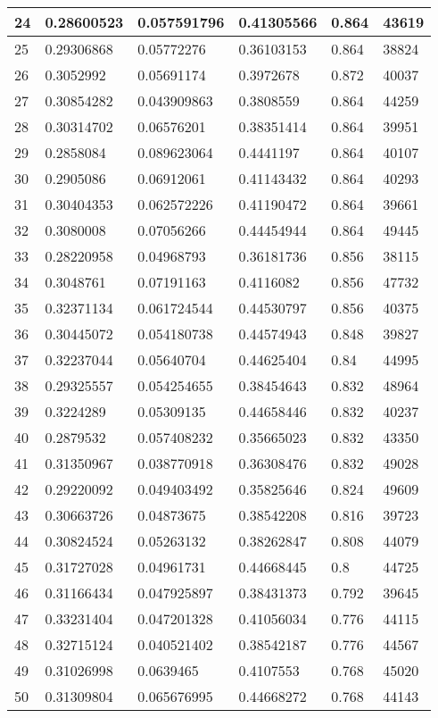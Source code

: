 \begin{longtable}{|l|l|l|l|l|l|}
24 & 0.28600523 & 0.057591796 & 0.41305566 & 0.864 & 43619 \\ \hline 
25 & 0.29306868 & 0.05772276 & 0.36103153 & 0.864 & 38824 \\ \hline 
26 & 0.3052992 & 0.05691174 & 0.3972678 & 0.872 & 40037 \\ \hline 
27 & 0.30854282 & 0.043909863 & 0.3808559 & 0.864 & 44259 \\ \hline 
28 & 0.30314702 & 0.06576201 & 0.38351414 & 0.864 & 39951 \\ \hline 
29 & 0.2858084 & 0.089623064 & 0.4441197 & 0.864 & 40107 \\ \hline 
30 & 0.2905086 & 0.06912061 & 0.41143432 & 0.864 & 40293 \\ \hline 
31 & 0.30404353 & 0.062572226 & 0.41190472 & 0.864 & 39661 \\ \hline 
32 & 0.3080008 & 0.07056266 & 0.44454944 & 0.864 & 49445 \\ \hline 
33 & 0.28220958 & 0.04968793 & 0.36181736 & 0.856 & 38115 \\ \hline 
34 & 0.3048761 & 0.07191163 & 0.4116082 & 0.856 & 47732 \\ \hline 
35 & 0.32371134 & 0.061724544 & 0.44530797 & 0.856 & 40375 \\ \hline 
36 & 0.30445072 & 0.054180738 & 0.44574943 & 0.848 & 39827 \\ \hline 
37 & 0.32237044 & 0.05640704 & 0.44625404 & 0.84 & 44995 \\ \hline 
38 & 0.29325557 & 0.054254655 & 0.38454643 & 0.832 & 48964 \\ \hline 
39 & 0.3224289 & 0.05309135 & 0.44658446 & 0.832 & 40237 \\ \hline 
40 & 0.2879532 & 0.057408232 & 0.35665023 & 0.832 & 43350 \\ \hline 
41 & 0.31350967 & 0.038770918 & 0.36308476 & 0.832 & 49028 \\ \hline 
42 & 0.29220092 & 0.049403492 & 0.35825646 & 0.824 & 49609 \\ \hline 
43 & 0.30663726 & 0.04873675 & 0.38542208 & 0.816 & 39723 \\ \hline 
44 & 0.30824524 & 0.05263132 & 0.38262847 & 0.808 & 44079 \\ \hline 
45 & 0.31727028 & 0.04961731 & 0.44668445 & 0.8 & 44725 \\ \hline 
46 & 0.31166434 & 0.047925897 & 0.38431373 & 0.792 & 39645 \\ \hline 
47 & 0.33231404 & 0.047201328 & 0.41056034 & 0.776 & 44115 \\ \hline 
48 & 0.32715124 & 0.040521402 & 0.38542187 & 0.776 & 44567 \\ \hline 
49 & 0.31026998 & 0.0639465 & 0.4107553 & 0.768 & 45020 \\ \hline 
50 & 0.31309804 & 0.065676995 & 0.44668272 & 0.768 & 44143 \\ \hline 
\end{longtable}